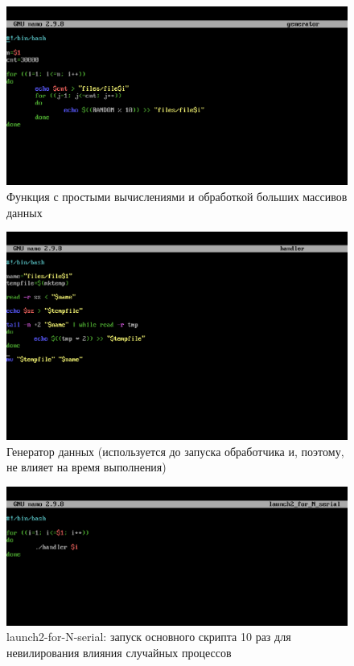 \documentclass{article}
\begin{document}
\begin{figure}[H]
\centering
\includegraphics[width=1\textwidth]{images/11.png}
\caption{Функция с простыми вычислениями и обработкой больших массивов данных}
\end{figure} 

\begin{figure}[H]
\centering
\includegraphics[width=1\textwidth]{images/12.png}
\caption{Генератор данных (используется до запуска обработчика и, поэтому, не влияет на время выполнения)}
\end{figure} 

\begin{figure}[H]
\centering
\includegraphics[width=1\textwidth]{images/13.png}
\caption{launch2-for-N-serial: запуск основного скрипта 10 раз для невилирования влияния случайных процессов}
\end{figure}
\end{document}
